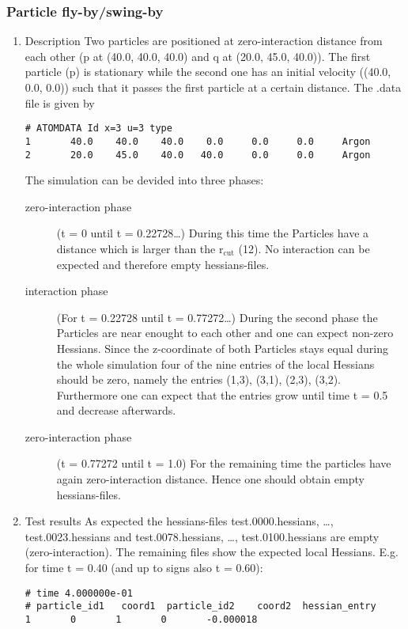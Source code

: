 \documentclass[11pt]{article}
\begin{document}
\subsubsection{Particle fly-by/swing-by}
\label{sec-1-4-5}
\begin{enumerate}
\item Description
\label{sec-1-4-5-1}
Two particles are positioned at zero-interaction distance from each other (p at (40.0, 40.0, 40.0) and q at (20.0, 45.0, 40.0)).
The first particle (p) is stationary while the second one has an initial velocity ((40.0, 0.0, 0.0)) such that it passes the
first particle at a certain distance.
The .data file is given by
\begin{verbatim}
# ATOMDATA Id x=3 u=3 type
1       40.0    40.0    40.0    0.0     0.0     0.0     Argon
2       20.0    45.0    40.0   40.0     0.0     0.0     Argon
\end{verbatim}
The simulation can be devided into three phases:
\begin{description}
\item[{zero-interaction phase}] (t = 0 until t = 0.22728\ldots{}) During this time the Particles have a distance which is larger than the r$_{\text{cut}}$ (12).
No interaction can be expected and therefore empty hessians-files.
\item[{interaction phase}] (For t = 0.22728 until t = 0.77272\ldots{}) During the second phase the Particles are near enought to each other
and one can expect non-zero Hessians. Since the z-coordinate of both Particles stays equal during the whole simulation
four of the nine entries of the local Hessians should be zero, namely the entries (1,3), (3,1), (2,3), (3,2).
Furthermore one can expect that the entries grow until time t = 0.5 and decrease afterwards.
\item[{zero-interaction phase}] (t = 0.77272 until t = 1.0) For the remaining time the particles have again zero-interaction distance.
Hence one should obtain empty hessians-files.
\end{description}
\item Test results
\label{sec-1-4-5-2}
As expected the hessians-files test.0000.hessians, \ldots{}, test.0023.hessians and test.0078.hessians, \ldots{}, test.0100.hessians are empty (zero-interaction).
The remaining files show the expected local Hessians. E.g. for time t = 0.40 (and up to signs also t = 0.60):
\begin{verbatim}
# time 4.000000e-01
# particle_id1   coord1  particle_id2    coord2  hessian_entry
1       0       1       0       -0.000018

\end{verbatim}
\end{enumerate}
\end{document}
